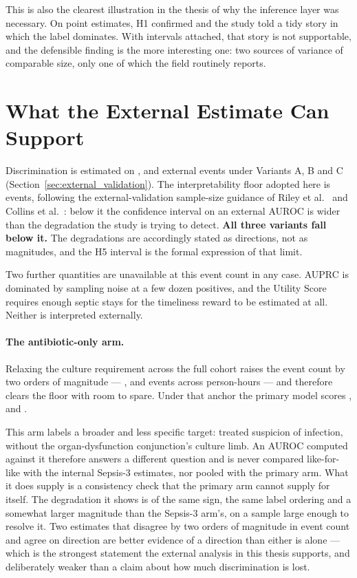 This is also the clearest illustration in the thesis of why the inference layer
was necessary. On point estimates, H1 confirmed and the study told a tidy story
in which the label dominates. With intervals attached, that story is not
supportable, and the defensible finding is the more interesting one: two
sources of variance of comparable size, only one of which the field routinely
reports.


\section{What the External Estimate Can Support}
\label{sec:external_interpretability}

Discrimination is estimated on \pcExtNEventsA{}, \pcExtNEventsB{} and
\pcExtNEventsC{} external events under Variants A, B and C
(Section~\ref{sec:external_validation}). The interpretability floor adopted
here is \pcExtMinEvents{} events, following the external-validation sample-size
guidance of Riley et al.\ \cite{riley2019sample} and Collins et al.\
\cite{collins2024tripodai}: below it the confidence interval on an external
AUROC is wider than the degradation the study is trying to detect.
\textbf{All three variants fall below it.} The degradations are accordingly
stated as directions, not as magnitudes, and the H5 interval is the formal
expression of that limit.

Two further quantities are unavailable at this event count in any case. AUPRC is
dominated by sampling noise at a few dozen positives, and the Utility Score
requires enough septic stays for the timeliness reward to be estimated at all.
Neither is interpreted externally.

\paragraph{The antibiotic-only arm.} Relaxing the culture requirement across
the full cohort raises the event count by two orders of magnitude ---
\pcExtAbxNEventsA, \pcExtAbxNEventsB{} and \pcExtAbxNEventsC{} events across
\pcExtAbxNRows{} person-hours --- and therefore clears the floor with room to
spare. Under that anchor the primary model scores \pcExtAbxAurocPrimaryA,
\pcExtAbxAurocPrimaryB{} and \pcExtAbxAurocPrimaryC.

This arm labels a broader and less specific target: treated suspicion of
infection, without the organ-dysfunction conjunction's culture limb. An AUROC
computed against it therefore answers a different question and is never
compared like-for-like with the internal Sepsis-3 estimates, nor pooled with the
primary arm. What it does supply is a consistency check that the primary arm
cannot supply for itself. The degradation it shows is of the same sign, the same
label ordering and a somewhat larger magnitude than the Sepsis-3 arm's, on a
sample large enough to resolve it. Two estimates that disagree by two orders of
magnitude in event count and agree on direction are better evidence of a
direction than either is alone --- which is the strongest statement the external
analysis in this thesis supports, and deliberately weaker than a claim about how
much discrimination is lost.

